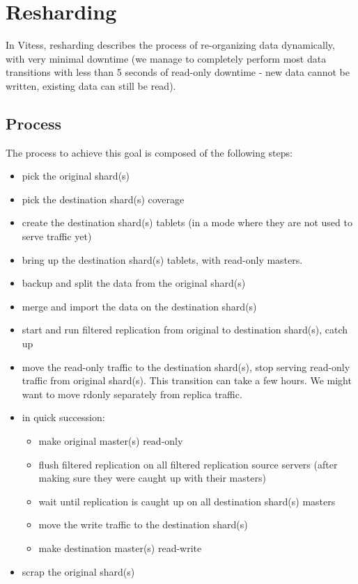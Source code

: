 \section{Resharding}\hypertarget{resharding}{}\label{resharding}

In Vitess, resharding describes the process of re-organizing data dynamically, with very minimal downtime (we manage to
completely perform most data transitions with less than 5 seconds of read-only downtime - new data cannot be written,
existing data can still be read).

\subsection{Process}\hypertarget{process}{}\label{process}

The process to achieve this goal is composed of the following steps:

\begin{itemize}
\item pick the original shard(s)
\item pick the destination shard(s) coverage
\item create the destination shard(s) tablets (in a mode where they are not used to serve traffic yet)
\item bring up the destination shard(s) tablets, with read-only masters.
\item backup and split the data from the original shard(s)
\item merge and import the data on the destination shard(s)
\item start and run filtered replication from original to destination shard(s), catch up
\item move the read-only traffic to the destination shard(s), stop serving read-only traffic from original shard(s). This transition can take a few hours. We might want to move rdonly separately from replica traffic.
\item in quick succession:
   \begin{itemize}
   \item make original master(s) read-only
   \item flush filtered replication on all filtered replication source servers (after making sure they were caught up with their masters)
   \item wait until replication is caught up on all destination shard(s) masters
   \item move the write traffic to the destination shard(s)
   \item make destination master(s) read-write
   \end{itemize}
\item scrap the original shard(s)
\end{itemize}


